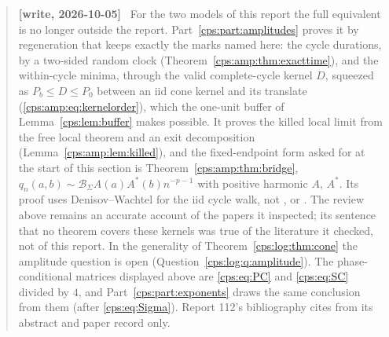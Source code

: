 \documentclass[11pt,letterpaper]{article}
\numberwithin{equation}{section}
\theoremstyle{remark}\newtheorem{remark}[theorem]{Remark}
\newenvironment{writenotelog}{\begin{quote}\small\sloppy\textbf{[write, 2026-10-05]}\ }{\end{quote}}
\begin{document}
\begin{writenotelog}
For the two models of this report the full equivalent is no longer outside the report.
Part~\ref{cps:part:amplitudes} proves it by regeneration that keeps exactly the marks named
here: the cycle durations, by a two-sided random clock (Theorem~\ref{cps:amp:thm:exacttime}), and
the within-cycle minima, through the valid complete-cycle kernel $D$, squeezed as
$P_b\le D\le P_0$ between an iid cone kernel and its translate (\eqref{cps:amp:eq:kernelorder}),
which the one-unit buffer of Lemma~\ref{cps:lem:buffer} makes possible. It proves the killed
local limit from the free local theorem and an exit decomposition
(Lemma~\ref{cps:amp:lem:killed}), and the fixed-endpoint form asked for at the start of this
section is Theorem~\ref{cps:amp:thm:bridge}, $q_n(a,b)\sim\mathcal B_\Sigma A(a)A^*(b)n^{-p-1}$ with
positive harmonic $A$, $A^*$. Its proof uses Denisov--Wachtel \cite{DWrevisited} for the iid
cycle walk, not \cite{DZ}, \cite{GLLP} or \cite{PPS}. The review above remains an accurate account
of the papers it inspected; its sentence that no theorem covers these kernels was true of the
literature it checked, not of this report. In the generality of Theorem~\ref{cps:log:thm:cone}
the amplitude question is open (Question~\ref{cps:log:q:amplitude}). The phase-conditional
matrices displayed above are \eqref{cps:eq:PC} and \eqref{cps:eq:SC} divided by $4$, and
Part~\ref{cps:part:exponents} draws the same conclusion from them (after \eqref{cps:eq:Sigma}).
Report 112's bibliography cites \cite{PPS} from its abstract and paper record only.
\end{writenotelog}
\end{document}
